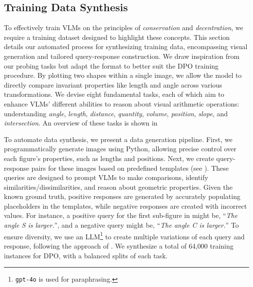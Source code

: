 \subsection{Training Data Synthesis}
\label{subsec:training_collect}



To effectively train VLMs on the principles of \textit{conservation} and \textit{decentration}, we require a training dataset designed to highlight these concepts. This section details our automated process for synthesizing training data, encompassing visual generation and tailored query-response construction. We draw inspiration from our probing tasks but adapt the format to better suit the DPO training procedure. By plotting two shapes within a single image, we allow the model to directly compare invariant properties like length and angle across various transformations. We devise eight fundamental tasks, each of which aim to enhance VLMs' different abilities to reason about visual arithmetic operations: understanding \textit{angle}, \textit{length}, \textit{distance}, \textit{quantity}, \textit{volume}, \textit{position}, \textit{slope}, and \textit{intersection}. An overview of these tasks is shown in 



To automate data synthesis, we present a data generation pipeline. First, we programmatically generate images using Python, allowing precise control over each figure's properties, such as lengths and positions. Next, we create query-response pairs for these images based on predefined templates (see ). These queries are designed to prompt VLMs to make comparisons, identify similarities/dissimilarities, and reason about geometric properties. Given the known ground truth, positive responses are generated by accurately populating placeholders in the templates, while negative responses are created with incorrect values. For instance, a positive query for the first sub-figure in  might be, “\textit{The angle S is larger.}”, and a negative query might be, “\textit{The angle C is larger.}” To ensure diversity, we use an LLM\footnote{\texttt{gpt-4o} is used for paraphrasing.} to create multiple variations of each query and response, following the approach of \citet{huang-etal-2024-crmarena}. We synthesize a total of 64,000 training instances for DPO, with a balanced splits of each task.







